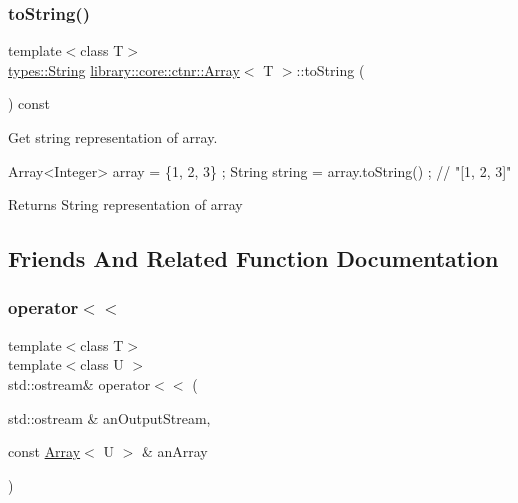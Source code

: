 \subsubsection{\texorpdfstring{to\+String()}{toString()}}
{\footnotesize\ttfamily template$<$class T$>$ \\
\hyperlink{classlibrary_1_1core_1_1types_1_1_string}{types\+::\+String} \hyperlink{classlibrary_1_1core_1_1ctnr_1_1_array}{library\+::core\+::ctnr\+::\+Array}$<$ T $>$\+::to\+String (\begin{DoxyParamCaption}{ }\end{DoxyParamCaption}) const}



Get string representation of array. 


\begin{DoxyCode}
Array<Integer> array = \{1, 2, 3\} ;
String \textcolor{keywordtype}{string} = array.toString() ; \textcolor{comment}{// "[1, 2, 3]"}
\end{DoxyCode}


\begin{DoxyReturn}{Returns}
String representation of array 
\end{DoxyReturn}


\subsection{Friends And Related Function Documentation}
\mbox{\label{classlibrary_1_1core_1_1ctnr_1_1_array_a9daa2d638e5bd693776f8bf6caae0802}} 
\subsubsection{\texorpdfstring{operator$<$$<$}{operator<<}}
{\footnotesize\ttfamily template$<$class T$>$ \\
template$<$class U $>$ \\
std\+::ostream\& operator$<$$<$ (\begin{DoxyParamCaption}\item[{std\+::ostream \&}]{an\+Output\+Stream,  }\item[{const \hyperlink{classlibrary_1_1core_1_1ctnr_1_1_array}{Array}$<$ U $>$ \&}]{an\+Array }\end{DoxyParamCaption})\hspace{0.3cm}{\ttfamily [friend]}}



